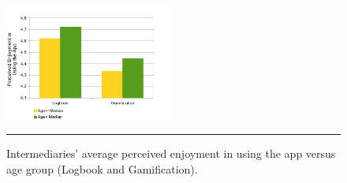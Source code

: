 \begin{figure}[htbp]
  \centering
    \includegraphics[width=0.5\textwidth]{Figures/PE_Interm_App_exp_seq.png}
    \rule{35em}{0.5pt}
  \caption{Intermediaries' average perceived enjoyment in using the app versus age group (Logbook and Gamification).}
  \label{figure:PE_Interm_App_exp_seq}
\end{figure}\newline
